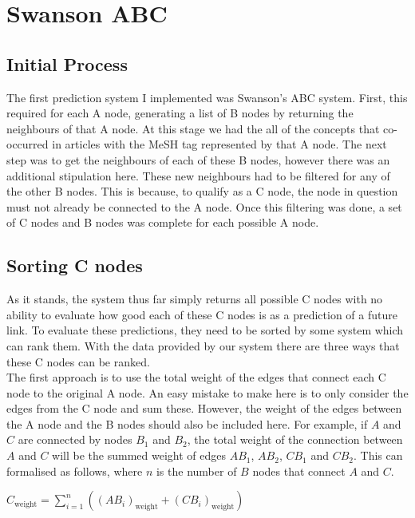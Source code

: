 \documentclass{l4proj}
\begin{document}
\section{Swanson ABC}

\subsection{Initial Process}

The first prediction system I implemented was Swanson's ABC system. First, this required for each A node, generating a list of B nodes by returning the neighbours of that A node. At this stage we had the all of the concepts that co-occurred in articles with the MeSH tag represented by that A node. The next step was to get the neighbours of each of these B nodes, however there was an additional stipulation here. These new neighbours had to be filtered for any of the other B nodes. This is because, to qualify as a C node, the node in question must not already be connected to the A node. Once this filtering was done, a set of C nodes and B nodes was complete for each possible A node. \\

\subsection{Sorting C nodes}

As it stands, the system thus far simply returns all possible C nodes with no ability to evaluate how good each of these C nodes is as a prediction of a future link. To evaluate these predictions, they need to be sorted by some system which can rank them. With the data provided by our system there are three ways that these C nodes can be ranked. \\

The first approach is to use the total weight of the edges that connect each C node to the original A node. An easy mistake to make here is to only consider the edges from the C node and sum these. However, the weight of the edges between the A node and the B nodes should also be included here. For example, if $A$ and $C$ are connected by nodes $B_1$ and $B_2$, the total weight of the connection between $A$ and $C$ will be the summed weight of edges $AB_1$, $AB_2$, $CB_1$ and $CB_2$. This can formalised as follows, where $n$ is the number of $B$ nodes that connect $A$ and $C$.
\begin{center}
    $C_{\text{weight}} = \sum_{i=1}^n ((AB_i)_{\text{weight}} + (CB_i)_{\text{weight}})$ \\
\end{center}
\end{document}
